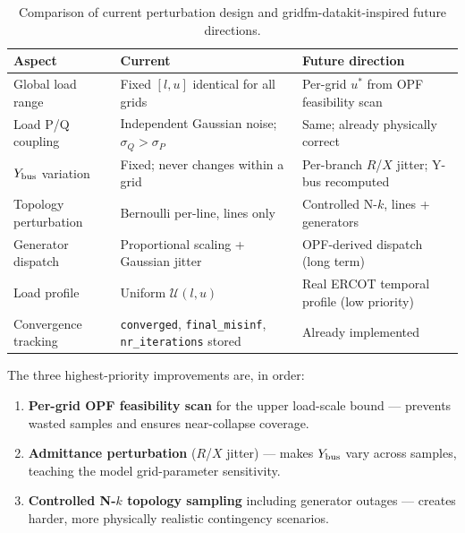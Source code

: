 \documentclass{article}
\begin{document}
\begin{table}[h]
\centering
\caption{Comparison of current perturbation design and gridfm-datakit-inspired
  future directions.}
\label{tab:comparison}
\renewcommand{\arraystretch}{1.3}
\begin{tabular}{p{3.2cm}p{4.2cm}p{4.2cm}}
\toprule
\textbf{Aspect} & \textbf{Current} & \textbf{Future direction} \\
\midrule
Global load range
  & Fixed $[l,u]$ identical for all grids
  & Per-grid $u^*$ from OPF feasibility scan \\
\hline
Load P/Q coupling
  & Independent Gaussian noise; $\sigma_Q > \sigma_P$
  & Same; already physically correct \\
\hline
$Y_{\rm bus}$ variation
  & Fixed; never changes within a grid
  & Per-branch $R$/$X$ jitter; Y-bus recomputed \\
\hline
Topology perturbation
  & Bernoulli per-line, lines only
  & Controlled N-$k$, lines + generators \\
\hline
Generator dispatch
  & Proportional scaling + Gaussian jitter
  & OPF-derived dispatch (long term) \\
\hline
Load profile
  & Uniform $\mathcal{U}(l,u)$
  & Real ERCOT temporal profile (low priority) \\
\hline
Convergence tracking
  & \texttt{converged}, \texttt{final\_misinf}, \texttt{nr\_iterations} stored
  & Already implemented \\
\bottomrule
\end{tabular}
\end{table}

\vspace{0.5em}
\noindent
The three highest-priority improvements are, in order:
\begin{enumerate}[noitemsep]
  \item \textbf{Per-grid OPF feasibility scan} for the upper load-scale bound
        --- prevents wasted samples and ensures near-collapse coverage.
  \item \textbf{Admittance perturbation} ($R$/$X$ jitter) --- makes $Y_{\rm bus}$
        vary across samples, teaching the model grid-parameter sensitivity.
  \item \textbf{Controlled N-$k$ topology sampling} including generator
        outages --- creates harder, more physically realistic contingency scenarios.
\end{enumerate}
\end{document}
